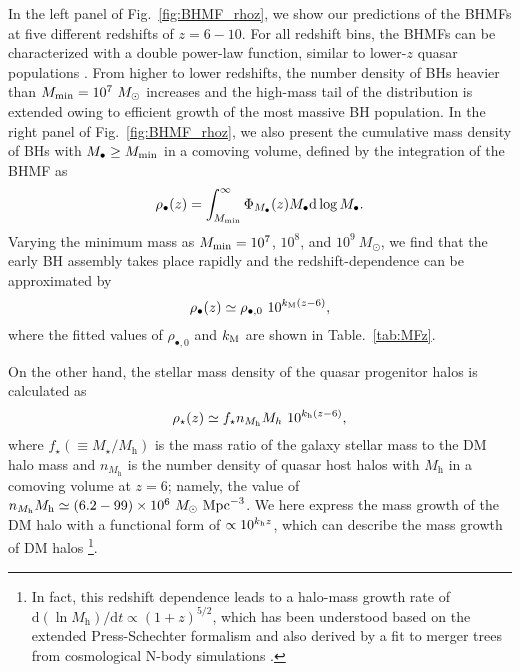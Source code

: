 \documentclass[twocolumn, twocolappendix]{aastex63}
\newcommand{\Msun}{M_\odot}
\newcommand{\Mh}{M_\mathrm{h}}
\newcommand{\Mbh}{M_\bullet}
\newcommand{\D}{\mathrm{d}}
\begin{document}
\begin{CJK*}{UTF8}{gbsn}
In the left panel of Fig.~\ref{fig:BHMF_rhoz}, we show our predictions of the BHMFs at five different redshifts of $z=6-10$.
For all redshift bins, the BHMFs can be characterized with a double power-law function, similar to lower-$z$ quasar populations
\citep[e.g.,][]{2013ApJ...764...45K,2015MNRAS.447.2085S}.
From higher to lower redshifts, the number density of BHs heavier than $M_{\rm min} = 10^7~\Msun$ increases
and the high-mass tail of the distribution is extended owing to efficient growth of the most massive BH population.
In the right panel of Fig.~\ref{fig:BHMF_rhoz}, we also present the cumulative mass density of BHs with $\Mbh \geq M_{\rm min}$ in a comoving volume,
defined by the integration of the BHMF as
%
\begin{equation}
 \rho_\bullet(z)=\int_{M_{\rm min}}^{\infty} \Phi_{\Mbh} (z) \Mbh \D \log \Mbh.
\end{equation}
%
Varying the minimum mass as $M_{\rm min}=10^7$, $10^8$, and $10^9~\Msun$,
we find that the early BH assembly takes place rapidly and the redshift-dependence can be approximated by
%
\begin{equation}
\rho_\bullet(z)
\simeq \rho_{\bullet,0}~ 10^{k_{\rm M}(z-6)},
\end{equation}
%
where the fitted values of $\rho_{\bullet,0}$ and $k_{\rm M}$ are shown in Table.~\ref{tab:MFz}.

On the other hand, the stellar mass density of the quasar progenitor halos is calculated as
%
\begin{equation}
\rho_{\star}(z)
\simeq f_\star n_{\Mh} M_h~ 10^{k_{\rm h}(z-6)},
\end{equation}
%
where $f_\star(\equiv M_\star/\Mh)$ is the mass ratio of the galaxy stellar mass to the DM halo mass and
$n_{\Mh}$ is the number density of quasar host halos with $\Mh$ in a comoving volume at $z=6$; namely,
the value of $n_{\Mh}\Mh \simeq (6.2-99)\times 10^6~\Msun~{\rm Mpc}^{-3}$.
We here express the mass growth of the DM halo with a functional form of $\propto 10^{k_{\rm h} z}$,
which can describe the mass growth of DM halos
\citep[e.g.,][]{2002ApJ...568...52W,2008MNRAS.383..615N,2008MNRAS.388.1792N,2010MNRAS.406.2267F}
\footnote[3]{
In fact, this redshift dependence leads to a halo-mass growth rate of $\D \left(\ln \Mh \right) / \D t \propto(1+z)^{5/2}$,
which has been understood based on the extended Press-Schechter formalism and also derived by
a fit to merger trees from cosmological N-body simulations \citep{2013MNRAS.435..999D}.}.


\end{CJK*}
\end{document}

